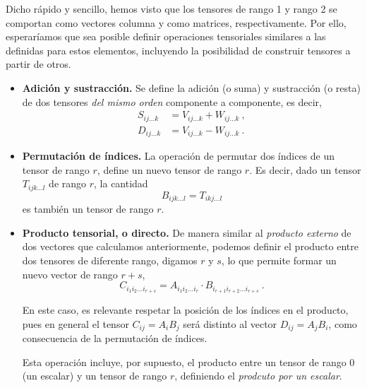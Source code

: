 Dicho rápido y sencillo, hemos visto que los tensores de rango 1 y rango 2 se comportan como vectores columna y como matrices, respectivamente. Por ello, esperaríamos que sea posible definir operaciones tensoriales similares a las definidas para estos elementos, incluyendo la posibilidad de construir tensores a partir de otros.

\begin{itemize}
    \item \textbf{Adición y sustracción.} Se define la adición (o suma) y sustracción (o resta) de dos tensores \emph{del mismo orden} componente a componente, es decir,
    \begin{align}
        S_{ij \dots k} & = V_{ij \dots k} + W_{ij \dots k} \ , \\
        D_{ij \dots k} & = V_{ij \dots k} - W_{ij \dots k} \ .
    \end{align}
    \item \textbf{Permutación de índices.} La operación de permutar dos índices de un tensor de rango $r$, define un nuevo tensor de rango $r$. Es decir, dado un tensor $T_{ijk \dots l}$ de rango $r$, la cantidad
    \begin{equation}
        B_{ijk \dots l} = T_{ikj \dots l} 
    \end{equation}
    es también un tensor de rango $r$.

    \item \textbf{Producto tensorial, o directo.} De manera similar al \emph{producto externo} de dos vectores que calculamos anteriormente, podemos definir el producto entre dos tensores de diferente rango, digamos $r$ y $s$, lo que permite formar un nuevo vector de rango $r+s$,
    \begin{equation}
        C_{i_1 i_2 \dots i_{r+s}} = A_{i_1 i_2 \dots i_r} \cdot B_{i_{r+1} i_{r+2} \dots i_{r+s}} \ .
    \end{equation}
    
    En este caso, es relevante respetar la posición de los índices en el producto, pues en general el tensor $C_{ij} = A_i B_j$ será distinto al vector $D_{ij} = A_j B_i$, como consecuencia de la permutación de índices.

    Esta operación incluye, por supuesto, el producto entre un tensor de rango 0 (un escalar) y un tensor de rango $r$, definiendo el \emph{prodcuto por un escalar}.


\end{itemize}
